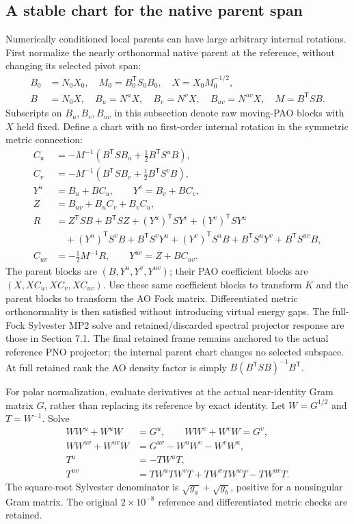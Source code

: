 \documentclass[11pt]{article}
\begin{document}
\subsection{A stable chart for the native parent span}
Numerically conditioned local parents can have large arbitrary internal
rotations. First normalize the nearly orthonormal native parent at the
reference, without changing its selected pivot span:
\begin{align}
 B_0&=N_0X_0,\quad M_0=B_0^{\mathsf T}S_0B_0,\quad
 X=X_0M_0^{-1/2},\\
 B&=N_0X,\quad B_u=N^uX,\quad B_v=N^vX,\quad B_{uv}=N^{uv}X,
 \quad M=B^{\mathsf T}SB .
\end{align}
Subscripts on $B_u,B_v,B_{uv}$ in this subsection denote raw moving-PAO
blocks with $X$ held fixed. Define a chart with no first-order internal
rotation in the symmetric metric connection:
\begin{align}
 C_u&=-M^{-1}\left(B^{\mathsf T}SB_u+
                    \tfrac12 B^{\mathsf T}S^uB\right),\\
 C_v&=-M^{-1}\left(B^{\mathsf T}SB_v+
                    \tfrac12 B^{\mathsf T}S^vB\right),\\
 Y^u&=B_u+BC_u,\qquad Y^v=B_v+BC_v,\\
 Z&=B_{uv}+B_uC_v+B_vC_u,\\
 R&=Z^{\mathsf T}SB+B^{\mathsf T}SZ
     +(Y^u)^{\mathsf T}SY^v+(Y^v)^{\mathsf T}SY^u\nonumber\\
  &\quad +(Y^u)^{\mathsf T}S^vB+B^{\mathsf T}S^vY^u
     +(Y^v)^{\mathsf T}S^uB+B^{\mathsf T}S^uY^v+B^{\mathsf T}S^{uv}B,\\
 C_{uv}&=-\tfrac12 M^{-1}R,\qquad Y^{uv}=Z+BC_{uv} .
\end{align}
The parent blocks are $(B,Y^u,Y^v,Y^{uv})$; their PAO coefficient blocks are
$(X,XC_u,XC_v,XC_{uv})$. Use these same coefficient blocks to transform $K$
and the parent blocks to transform the AO Fock matrix. Differentiated metric
orthonormality is then satisfied without introducing virtual energy gaps.
The full-Fock Sylvester MP2 solve and retained/discarded spectral projector
response are those in Section 7.1. The final retained frame remains anchored
to the actual reference PNO projector; the internal parent chart changes no
selected subspace. At full retained rank the AO density factor is simply
$B(B^{\mathsf T}SB)^{-1}B^{\mathsf T}$.

For polar normalization, evaluate derivatives at the actual near-identity
Gram matrix $G$, rather than replacing its reference by exact identity.
Let $W=G^{1/2}$ and $T=W^{-1}$. Solve
\begin{align}
 WW^u+W^uW&=G^u,\qquad WW^v+W^vW=G^v,\\
 WW^{uv}+W^{uv}W&=G^{uv}-W^uW^v-W^vW^u,\\
 T^u&=-TW^uT,\\
 T^{uv}&=TW^uTW^vT+TW^vTW^uT-TW^{uv}T .
\end{align}
The square-root Sylvester denominator is $\sqrt{g_a}+\sqrt{g_b}$, positive
for a nonsingular Gram matrix. The original $2\times10^{-8}$ reference
and differentiated metric checks are retained.
\end{document}
